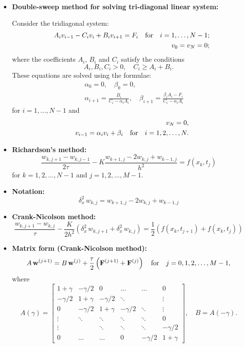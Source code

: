\documentclass[12pt]{article}
\begin{document}
\begin{itemize}
\item \textbf{Double-sweep method for solving tri-diagonal linear system:}

Consider the tridiagonal system:
\begin{eqnarray}
&&A_{i}v_{i-1}-C_{i}v_{i}+B_{i}v_{i+1}=F_{i} \quad \hbox{for}\quad i=1, \dots, N-1; \nonumber \\
&&v_{0}=v_{N}=0; \nonumber
\end{eqnarray}
where the coefficients $A_{i}$, $B_{i}$ and $C_{i}$ satisfy the conditions
\[
A_{i}, B_{i}, C_{i} > 0, \quad  C_{i} \geq A_{i} + B_{i}.
\]
These equations are solved using the formulae:
\begin{eqnarray}
&&\alpha_0=0, \quad \beta_0=0, \nonumber \\
&&\alpha_{i+1}=\frac{B_{i}}{C_{i}-\alpha_{i}A_{i}}, \quad
\beta_{i+1}=\frac{\beta_{i}A_{i}-F_{i}}{C_{i}-\alpha_{i}A_{i}} \nonumber
\end{eqnarray}
for $i=1, \dots, N-1$ and
\begin{eqnarray}
&&v_N=0,  \nonumber \\
&&v_{i-1}=\alpha_{i}v_{i}+\beta_{i}  \quad  \hbox{for} \quad
i=1, 2, \dots, N.
\nonumber
\end{eqnarray}


\item \textbf{Richardson's method:}
\[
\frac{w_{k,j+1}-w_{k,j-1}}{2\tau}-K \frac{w_{k+1,
j}-2w_{k,j}+w_{k-1,j}}{h^{2}}=f(x_k,t_j)
\]
for $k=1, 2, \dots, N-1$ and $j=1, 2, \dots, M-1$.

\item \textbf{Notation:}
\[
\delta_{x}^2  \, w_{k,j}=w_{k+1,j}-2w_{k,j}+w_{k-1,j}
\]


\item \textbf{Crank-Nicolson method:}
\[
\frac{w_{k,j+1}-w_{k,j}}{\tau}- \frac{K}{2h^{2}}\left(
\delta_{x}^{2} \, w_{k,j+1}+\delta_{x}^{2} \, w_{k,j}\right)=
\frac12\left(f(x_k,t_{j+1})+f(x_k,t_j)\right)
\]


\item \textbf{Matrix form (Crank-Nicolson method):}
\[
A \, {\bf w}^{(j+1)}=B \, {\bf w}^{(j)} 
+\frac{\tau}{2}\left({\bf F}^{(j+1)}+{\bf F}^{(j)}\right)\quad \hbox{for} \quad
j=0,1,2,\dots,M-1,
\]
where
\[
A(\gamma)=\left[
\begin{array}{cccccc}
1+\gamma &-\gamma/2 &0      &\dots  &\dots &0 \\
-\gamma/2 &1+\gamma &-\gamma/2 &\ddots  &     &\vdots \\
0      &-\gamma/2 &1+\gamma &-\gamma/2 &\ddots &\vdots \\
\vdots &\ddots &\ddots &\ddots &\ddots &0 \\
\vdots &       &\ddots &\ddots &\ddots &-\gamma/2 \\
0      &\dots  &\dots  &0      &-\gamma/2 &1+\gamma
\end{array}\right], \quad
B=A(-\gamma).
\]



\end{itemize}
\end{document}
